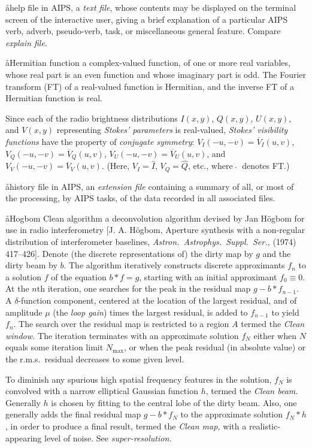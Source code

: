 \aa{help file}
in AIPS, a {\it text file}, whose contents may be displayed
on the terminal screen of the interactive user,
giving a brief explanation of a particular AIPS verb, adverb,
pseudo-verb, task, or miscellaneous general feature.
Compare {\it explain file}.

\aa{Hermitian function}
a complex-valued function, of one or more real variables,
whose real part is an even function and whose imaginary part is odd.
The Fourier transform (FT) of a real-valued function is Hermitian,
and the inverse FT of a Hermitian function is real.
\par
Since each of the radio brightness distributions
$I(x,y)$, $Q(x,y)$, $U(x,y)$, and $V(x,y)$
representing {\it Stokes' parameters}
is real-valued,
{\it Stokes' visibility functions} have the property
of {\it conjugate symmetry}\/:
$V_I(-u,-v)=\overline V_I(u,v)$,
$V_Q(-u,-v)=\overline V_Q(u,v)$,
$V_U(-u,-v)=\overline V_U(u,v)$,
and $V_V(-u,-v)=\overline V_V(u,v)$.
(Here, $V_I=\hat I$, $V_Q=\hat Q$, etc., where $\ \hat {}\ $ denotes FT.)

\aa{history file}
in AIPS, an {\it extension file} containing a summary
of all, or most of the processing, by AIPS tasks, of the data recorded
in all associated files.

\aa{Hogbom Clean algorithm}
a deconvolution algorithm
devised by Jan H\"ogbom for use in radio interferometry
[J. A. H\"ogbom, Aperture synthesis with a non-regular
distribution of interferometer baselines, {\it Astron.\ Astrophys.\
Suppl.\ Ser.,}  (1974) 417--426].
Denote (the discrete representations of) the dirty map by $g$
and the dirty beam by $b$.
The algorithm iteratively constructs discrete approximants $f_n$
to a solution $f$ of the equation $b\ast f=g$,
starting with an initial approximant $f_0\equiv0$.
At the $n$th iteration, one searches for the peak in the
residual map $g-b\ast f_{n-1}$.
A $\delta$-function component, centered at the location of the largest
residual, and of amplitude $\mu$ (the {\it loop gain}\/)
times the largest residual, is added to $f_{n-1}$ to yield $f_n$.
The search over the residual map is restricted to a region $A$
termed the {\it Clean window.}
The iteration terminates with an approximate solution $f_N$
either when $N$ equals some iteration limit $N_{\operatorname{max}}$,
or when the peak residual (in absolute value) or the r.m.s.\
residual decreases to some given level.
\par
To diminish any spurious high spatial frequency features in
the solution, $f_N$ is convolved with a narrow elliptical Gaussian
function $h$, termed the {\it Clean beam.}
Generally $h$ is chosen by fitting to the central lobe of the
dirty beam.
Also, one generally adds the final residual map $g-b\ast f_N$
to the approximate solution $f_N\ast h$, in order to produce
a final result, termed the {\it Clean map,} with a
realistic-appearing level of noise.
See {\it super-resolution.}

